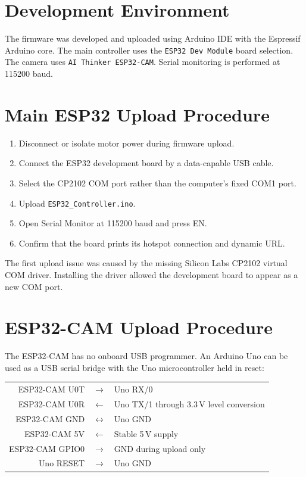 \documentclass[12pt,a4paper,oneside]{report}
\newcommand{\code}[1]{\texttt{#1}}
\begin{document}
\section{Development Environment}
The firmware was developed and uploaded using Arduino IDE with the Espressif
Arduino core. The main controller uses the \code{ESP32 Dev Module} board
selection. The camera uses \code{AI Thinker ESP32-CAM}. Serial monitoring is
performed at 115200 baud.

\section{Main ESP32 Upload Procedure}
\begin{enumerate}
  \item Disconnect or isolate motor power during firmware upload.
  \item Connect the ESP32 development board by a data-capable USB cable.
  \item Select the CP2102 COM port rather than the computer's fixed COM1 port.
  \item Upload \code{ESP32\_Controller.ino}.
  \item Open Serial Monitor at 115200 baud and press EN.
  \item Confirm that the board prints its hotspot connection and dynamic URL.
\end{enumerate}

The first upload issue was caused by the missing Silicon Labs CP2102 virtual COM
driver. Installing the driver allowed the development board to appear as a new
COM port.

\section{ESP32-CAM Upload Procedure}
The ESP32-CAM has no onboard USB programmer. An Arduino Uno can be used as a USB
serial bridge with the Uno microcontroller held in reset:

\begin{center}
\begin{tabular}{rcl}
  ESP32-CAM U0T & $\rightarrow$ & Uno RX/0 \\
  ESP32-CAM U0R & $\leftarrow$ & Uno TX/1 through 3.3\,V level conversion \\
  ESP32-CAM GND & $\leftrightarrow$ & Uno GND \\
  ESP32-CAM 5V & $\leftarrow$ & Stable 5\,V supply \\
  ESP32-CAM GPIO0 & $\rightarrow$ & GND during upload only \\
  Uno RESET & $\rightarrow$ & Uno GND
\end{tabular}
\end{center}
\end{document}
